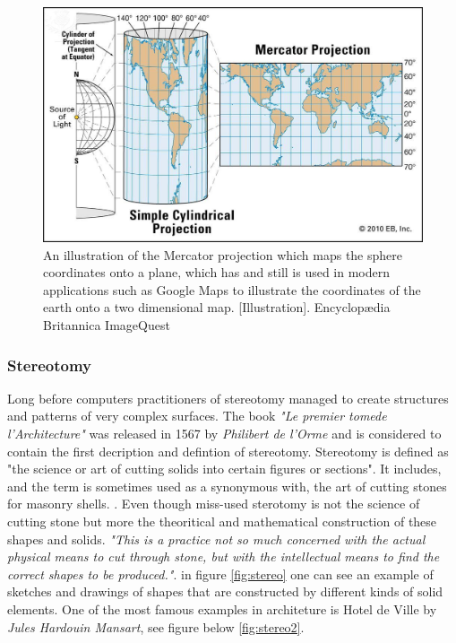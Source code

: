 \begin{figure}[H]
\centering
\includegraphics[width=0.9\linewidth ]{figure/Introduction/Mercator.jpg}
\caption{An illustration of the Mercator projection which maps the sphere coordinates onto a plane, which has and still is used in modern applications such as Google Maps\cite{ref:maps} to illustrate the coordinates of the earth onto a two dimensional map. [Illustration]. Encyclopædia Britannica ImageQuest}
\end{figure}



\subsubsection{Stereotomy }
  
Long before computers practitioners of stereotomy managed to create structures and patterns of very complex surfaces. The book \textit{"Le premier tomede l'Architecture"} was released in 1567 by \textit{Philibert de l'Orme} and is considered to contain the first decription and defintion of stereotomy\cite{ref:stereotomy2}. 
Stereotomy is defined as "the science or art of cutting solids into certain figures or sections". It includes, and the term is sometimes used as a synonymous with, the art of cutting stones for masonry shells. \cite{ref:Porter}. Even though miss-used sterotomy is not the science of cutting stone but more the theoritical and mathematical construction of these shapes and solids.
\textit{"This is a practice not so much concerned with the actual physical means to cut through stone, but with the intellectual means to find the correct shapes to be produced."}\cite{ref:stereotomy2}. in figure \ref{fig:stereo} one can see an example of sketches and drawings of shapes that are constructed by different kinds of solid elements. One of the most famous examples in architeture is Hotel de Ville by \textit{Jules Hardouin Mansart}, see figure below \ref{fig:stereo2}.

